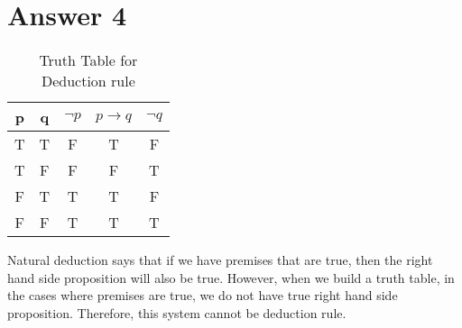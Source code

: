 \documentclass[12pt]{article}
\begin{document}
\section*{Answer 4}
\begin{table}[H]
\small
\caption{Truth Table for Deduction rule}
\centering
\label{table3}
\begin{tabular}{|c|c|c|c|c|}	%
\hline 							%
\textbf{p} & \textbf{q} & \textbf{$\neg p $} & \textbf{$p \rightarrow q$} & \textbf{$ \neg q$}  \\
\hline
\hline
T & T & F & T & F \\			%
T & F & F & F & T \\
F & T & T & T & F \\
F & F & T & T & T \\
\hline
\end{tabular}
\end{table}

Natural deduction says that if we have premises that are true, then the right hand side 	proposition will also be true. However, when we build a truth table, in the cases where premises are true, we do not have true right hand side proposition. Therefore, this system cannot be deduction rule.
\end{document}
